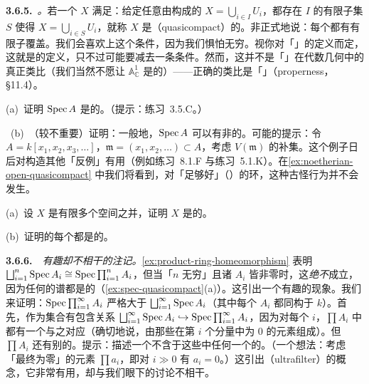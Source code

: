 \textbf{3.6.5.}\ \emph{\trQuasicompactness{}。}\quad 若一个\trTopologicalSpace{} $X$ 满足：给定任意由\trOpenSet{}构成的\trCover{} $X=\bigcup_{i\in I}U_i$，都存在\trIndexSet{} $I$ 的有限子集 $S$ 使得 $X=\bigcup_{i\in S}U_i$，就称 $X$ 是\textbf{\trQuasicompact}（quasicompact）的。非正式地说：每个\trOpenCover{}都有有限子覆盖。我们会喜欢上这个条件，因为我们惧怕无穷。视你对「\trCompactness」的定义而定，这就是\trCompactness{}的定义，只不过可能要减去一条\trHausdorff{}条件。然而，这并不是「\trCompact」在代数几何中的真正类比（我们当然不愿让 $\mathbb{A}^1_{\mathbb{C}}$ 是\trCompact{}的）——正确的类比是「\trProperness{}」（properness，\S11.4）。

\begin{exercise}\label{ex:spec-quasicompact}
(a)~证明 $\operatorname{Spec} A$ 是\trQuasicompact{}的。（提示：练习~3.5.C。）

\hard\ (b)~（较不重要）证明：一般地，$\operatorname{Spec} A$ 可以有非\trQuasicompact{}的\trOpenSet。可能的提示：令 $A=k[x_1,x_2,x_3,\dots]$，$\mathfrak{m}=(x_1,x_2,\dots)\subset A$，考虑 $V(\mathfrak{m})$ 的补集。这个例子日后对构造其他「反例」有用（例如练习~8.1.F 与练习~5.1.K）。在\cref{ex:noetherian-open-quasicompact} 中我们将看到，对「足够好」（\trNoetherian）的环，这种古怪行为并不会发生。
\end{exercise}

\begin{exercise}\label{ex:finite-union-quasicompact}
(a)~设\trTopologicalSpace{} $X$ 是有限多个\trQuasicompact{}空间之并，证明 $X$ 是\trQuasicompact{}的。

(b)~证明\trQuasicompact{}\trTopologicalSpace{}的每个\trClosedSubset{}都是\trQuasicompact{}的。
\end{exercise}

\textbf{3.6.6.}\ \extrahard\ \emph{有趣却不相干的注记。}\quad \cref{ex:product-ring-homeomorphism} 表明 $\bigsqcup_{i=1}^{n}\operatorname{Spec} A_i\cong\operatorname{Spec}\prod_{i=1}^{n}A_i$，但当「$n$ 无穷」且诸 $A_i$ 皆非零时，这\emph{绝不}成立，因为任何\trRing{}的谱都是\trQuasicompact{}的（\cref{ex:spec-quasicompact}(a)）。这引出一个有趣的现象。我们来证明：$\operatorname{Spec}\prod_{i=1}^{\infty}A_i$ 严格大于 $\bigsqcup_{i=1}^{\infty}\operatorname{Spec} A_i$（其中每个 $A_i$ 都同构于\trField{} $k$）。首先，作为集合有包含关系 $\bigsqcup_{i=1}^{\infty}\operatorname{Spec} A_i\hookrightarrow\operatorname{Spec}\prod_{i=1}^{\infty}A_i$，因为对每个 $i$，$\prod A_i$ 中都有一个\trMaximalIdeal{}与之对应（确切地说，由那些在第 $i$ 个分量中为 $0$ 的元素组成）。但 $\prod A_i$ 还有别的\trMaximalIdeal。提示：描述一个不含于这些\trMaximalIdeal{}中任何一个的\trProperIdeal。（一个想法：考虑「最终为零」的元素 $\prod a_i$，即对 $i\gg 0$ 有 $a_i=0$。）这引出\emph{\trUltrafilter{}}（ultrafilter）的概念，它非常有用，却与我们眼下的讨论不相干。

